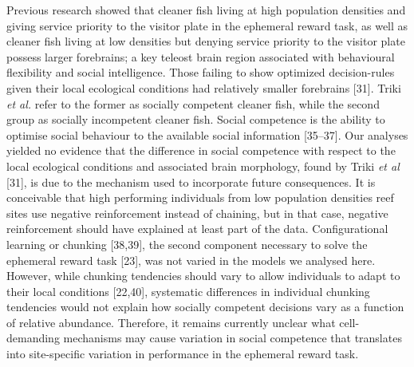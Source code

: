 \documentclass[10pt,letterpaper]{article}
\begin{document}
Previous research showed that cleaner fish living at high population
densities and giving service priority to the visitor plate in the
ephemeral reward task, as well as cleaner fish living at low densities
but denying service priority to the visitor plate possess larger
forebrains; a key teleost brain region associated with behavioural
flexibility and social intelligence. Those failing to show optimized
decision-rules given their local ecological conditions had relatively
smaller forebrains {[}31{]}. Triki \emph{et al.} refer to the former as
socially competent cleaner fish, while the second group as socially
incompetent cleaner fish. Social competence is the ability to optimise
social behaviour to the available social information {[}35--37{]}. Our
analyses yielded no evidence that the difference in social competence
with respect to the local ecological conditions and associated brain
morphology, found by Triki \emph{et al} {[}31{]}, is due to the
mechanism used to incorporate future consequences. It is conceivable
that high performing individuals from low population densities reef
sites use negative reinforcement instead of chaining, but in that case,
negative reinforcement should have explained at least part of the data.
Configurational learning or chunking {[}38,39{]}, the second component
necessary to solve the ephemeral reward task {[}23{]}, was not varied in
the models we analysed here. However, while chunking tendencies should
vary to allow individuals to adapt to their local conditions
{[}22,40{]}, systematic differences in individual chunking tendencies
would not explain how socially competent decisions vary as a function of
relative abundance. Therefore, it remains currently unclear what
cell-demanding mechanisms may cause variation in social competence that
translates into site-specific variation in performance in the ephemeral
reward task.
\end{document}

